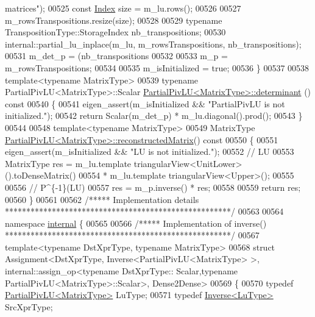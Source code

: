 \begin{DoxyCode}
{       matrices"});
00525   \textcolor{keyword}{const} \hyperlink{group___core___module_a554f30542cc2316add4b1ea0a492ff02}{Index} size = m\_lu.rows();
00526 
00527   m\_rowsTranspositions.resize(size);
00528 
00529   \textcolor{keyword}{typename} TranspositionType::StorageIndex nb\_transpositions;
00530   internal::partial\_lu\_inplace(m\_lu, m\_rowsTranspositions, nb\_transpositions);
00531   m\_det\_p = (nb\_transpositions%
00532 
00533   m\_p = m\_rowsTranspositions;
00534 
00535   m\_isInitialized = \textcolor{keyword}{true};
00536 \}
00537 
00538 \textcolor{keyword}{template}<\textcolor{keyword}{typename} MatrixType>
00539 \textcolor{keyword}{typename} PartialPivLU<MatrixType>::Scalar \hyperlink{group___l_u___module_a54c3d39c9b46ff485a8d2140b9b23193}{PartialPivLU<MatrixType>::determinant}
      ()\textcolor{keyword}{ const}
00540 \textcolor{keyword}{}\{
00541   eigen\_assert(m\_isInitialized && \textcolor{stringliteral}{"PartialPivLU is not initialized."});
00542   \textcolor{keywordflow}{return} Scalar(m\_det\_p) * m\_lu.diagonal().prod();
00543 \}
00544 
00548 \textcolor{keyword}{template}<\textcolor{keyword}{typename} MatrixType>
00549 MatrixType \hyperlink{group___l_u___module_aba7f1ee83537b0d240ebf206503a4920}{PartialPivLU<MatrixType>::reconstructedMatrix}()\textcolor{keyword}{
       const}
00550 \textcolor{keyword}{}\{
00551   eigen\_assert(m\_isInitialized && \textcolor{stringliteral}{"LU is not initialized."});
00552   \textcolor{comment}{// LU}
00553   MatrixType res = m\_lu.template triangularView<UnitLower>().toDenseMatrix()
00554                  * m\_lu.template triangularView<Upper>();
00555 
00556   \textcolor{comment}{// P^\{-1\}(LU)}
00557   res = m\_p.inverse() * res;
00558 
00559   \textcolor{keywordflow}{return} res;
00560 \}
00561 
00562 \textcolor{comment}{/***** Implementation details *****************************************************/}
00563 
00564 \textcolor{keyword}{namespace }\hyperlink{namespaceinternal}{internal} \{
00565 
00566 \textcolor{comment}{/***** Implementation of inverse() *****************************************************/}
00567 \textcolor{keyword}{template}<\textcolor{keyword}{typename} DstXprType, \textcolor{keyword}{typename} MatrixType>
00568 \textcolor{keyword}{struct }Assignment<DstXprType, Inverse<PartialPivLU<MatrixType> >, internal::assign\_op<typename DstXprType::
      Scalar,typename PartialPivLU<MatrixType>::Scalar>, Dense2Dense>
00569 \{
00570   \textcolor{keyword}{typedef} \hyperlink{group___l_u___module_class_eigen_1_1_partial_piv_l_u}{PartialPivLU<MatrixType>} LuType;
00571   \textcolor{keyword}{typedef} \hyperlink{class_eigen_1_1_inverse}{Inverse<LuType>} SrcXprType;

\end{DoxyCode}
